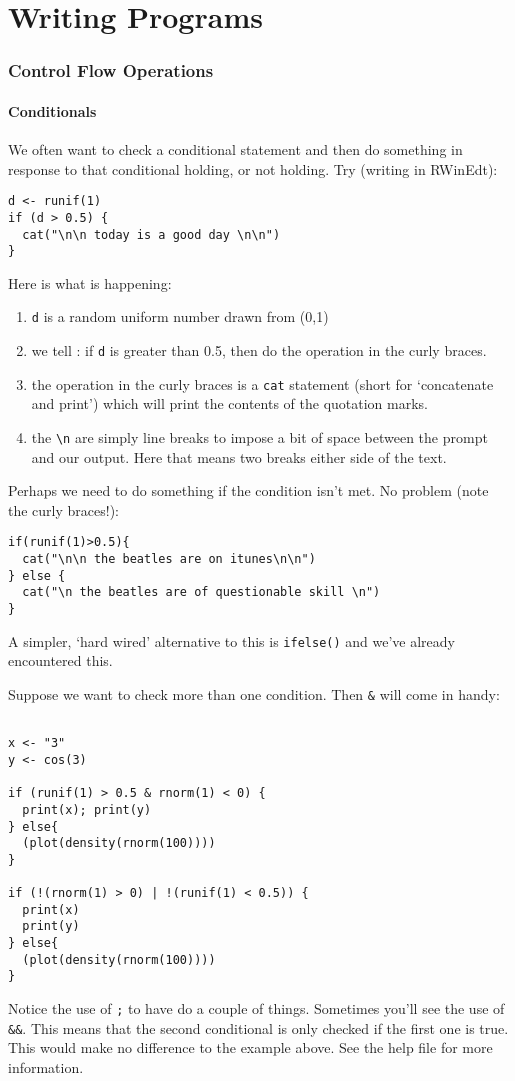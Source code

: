 \part{Writing Programs}
\section{Control Flow Operations}
\subsection{Conditionals}

We often want to check a conditional statement and then do something
in response to that conditional holding, or not holding. Try (writing
in RWinEdt):
\begin{verbatim}
d <- runif(1)
if (d > 0.5) {
  cat("\n\n today is a good day \n\n")
}
\end{verbatim}

Here is what is happening:

\begin{enumerate}
\item \texttt{d} is a random uniform number drawn from (0,1)%
\item we tell \R: if \texttt{d} is greater than 0.5, then do the
  operation in the curly \texttt{} braces.%
\item the operation in the curly braces is a \texttt{cat} statement
  (short for `concatenate and print') which will print the contents of
  the quotation marks.%
\item the \verb=\n= are simply line breaks to impose a bit of
  space between the prompt and our output.  Here that means two breaks
  either side of the text.
\end{enumerate}

Perhaps we need \R{} to do something if the condition isn't met.  No
problem (note the curly braces!):
\begin{verbatim}
if(runif(1)>0.5){
  cat("\n\n the beatles are on itunes\n\n")
} else {
  cat("\n the beatles are of questionable skill \n")
}
\end{verbatim}
A simpler, `hard wired' alternative to this is \texttt{ifelse()} and
we've already encountered this.

Suppose we want to check more than one condition. Then \verb!&! will
come in handy:
\begin{verbatim}

x <- "3"
y <- cos(3)

if (runif(1) > 0.5 & rnorm(1) < 0) {
  print(x); print(y)
} else{
  (plot(density(rnorm(100))))
}

if (!(rnorm(1) > 0) | !(runif(1) < 0.5)) {
  print(x)
  print(y)
} else{
  (plot(density(rnorm(100))))
}
\end{verbatim}
Notice the use of \texttt{;} to have \R{} do a couple of things.
Sometimes you'll see the use of \verb!&&!.  This means that the second
conditional is only checked if the first one is true.  This
would make no difference to the example above. See the help file for more information.

